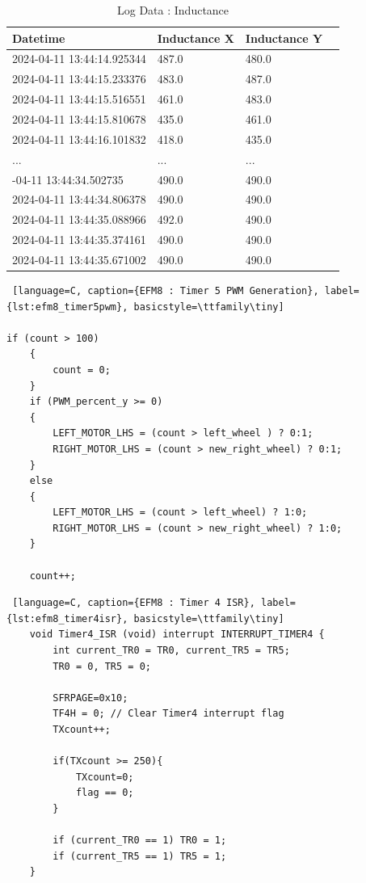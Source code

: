\documentclass{article}
\begin{document}
\begin{table}[ht]
    \centering
    \begin{tabular}{@{}llll@{}}
        \toprule
        \textbf{Datetime}                & \textbf{Inductance X} & \textbf{Inductance Y} \\ \midrule
        2024-04-11 13:44:14.925344 & 487.0 & 480.0 \\
        2024-04-11 13:44:15.233376 & 483.0 & 487.0 \\
        2024-04-11 13:44:15.516551 & 461.0 & 483.0 \\
        2024-04-11 13:44:15.810678 & 435.0 & 461.0 \\
        2024-04-11 13:44:16.101832 & 418.0 & 435.0 \\ \addlinespace
        ...                            & ...   & ...   \\ \addlinespace
        2024-04-11 13:44:34.502735 & 490.0 & 490.0 \\
        2024-04-11 13:44:34.806378 & 490.0 & 490.0 \\
        2024-04-11 13:44:35.088966 & 492.0 & 490.0 \\
        2024-04-11 13:44:35.374161 & 490.0 & 490.0 \\
        2024-04-11 13:44:35.671002 & 490.0 & 490.0 \\ \bottomrule
    \end{tabular}
    \caption{Log Data : Inductance}
    \label{table:inductance_log_table}
\end{table}

\newpage
\begin{lstlisting} [language=C, caption={EFM8 : Timer 5 PWM Generation}, label={lst:efm8_timer5pwm}, basicstyle=\ttfamily\tiny]

if (count > 100)
    {
        count = 0;
    }
    if (PWM_percent_y >= 0)
    {
        LEFT_MOTOR_LHS = (count > left_wheel ) ? 0:1;
        RIGHT_MOTOR_LHS = (count > new_right_wheel) ? 0:1;
    }
    else
    {
        LEFT_MOTOR_LHS = (count > left_wheel) ? 1:0;
        RIGHT_MOTOR_LHS = (count > new_right_wheel) ? 1:0;
    }

    count++;

\end{lstlisting}

\begin{lstlisting} [language=C, caption={EFM8 : Timer 4 ISR}, label={lst:efm8_timer4isr}, basicstyle=\ttfamily\tiny]
    void Timer4_ISR (void) interrupt INTERRUPT_TIMER4 {
        int current_TR0 = TR0, current_TR5 = TR5;
        TR0 = 0, TR5 = 0;

        SFRPAGE=0x10;
        TF4H = 0; // Clear Timer4 interrupt flag
        TXcount++;

        if(TXcount >= 250){
            TXcount=0;
            flag == 0;
        }

        if (current_TR0 == 1) TR0 = 1;
        if (current_TR5 == 1) TR5 = 1;
    }
\end{lstlisting}
\end{document}
